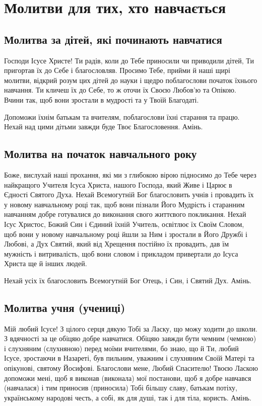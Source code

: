 \documentclass[chapters.tex]{subfiles}
\begin{document}
\chapter{Молитви для тих, хто навчається}
\section{Молитва за дітей, які починають навчатися}
Господи Ісусе Христе! Ти радів, коли до Тебе приносили чи приводили дітей, Ти пригортав їх до Себе і благословляв. Просимо Тебе, прийми й наші щирі молитви, відкрий розум цих дітей до науки і щедро поблагослови початок їхнього навчання. Ти кличеш їх до Себе, то ж оточи їх Своєю Любов’ю та Опікою. Вчини так, щоб вони зростали в мудрості та у Твоїй Благодаті.

Допоможи їхнім батькам та вчителям, поблагослови їхні старання та працю. Нехай над цими дітьми завжди буде Твоє Благословення. Амінь.

\section{Молитва на початок навчального року}
Боже, вислухай наші прохання, які ми з глибокою вірою підносимо до Тебе через найкращого Учителя Ісуса Христа, нашого Господа, який Живе і Царює в Єдності Святого Духа. Нехай Всемогутній Бог благословить учнів і провадить їх у новому навчальному році так, щоб вони пізнали Його Мудрість і старанним навчанням добре готувалися до виконання свого життєвого покликання. Нехай Ісус Христос, Божий Син і Єдиний їхній Учитель, освітлює їх Своїм Словом, щоб вони у новому навчальному році йшли за Ним і зростали в Його Дружбі і Любові, а Дух Святий, який від Хрещення постійно їх провадить, дав їм мужність і витривалість, щоб вони словом і прикладом привертали до Ісуса Христа ще й інших людей.

Нехай усіх їх благословить Всемогутній Бог Отець, і Син, і Святий Дух. Амінь.

\section{Молитва учня (учениці)}
Мій любий Ісусе! З цілого серця дякую Тобі за Ласку, що можу ходити до школи. З вдячності за це обіцяю добре навчатися. Обіцяю завжди бути чемним (чемною) і слухняним (слухняною) перед моїми вчителями, бо знаю, що й Ти, любий Ісусе, зростаючи в Назареті, був пильним, уважним і слухняним Своїй Матері та опікунові, святому Йосифові. Благослови мене, Любий Спасителю! Твоєю Ласкою допоможи мені, щоб я виконав (виконала) мої постанови, щоб я добре навчався (навчалася) і тим приносив (приносила) Тобі більшу славу, батькам потіху, українському народові честь, а собі, як для душі, так і для тіла, користь. Амінь.
\end{document}
